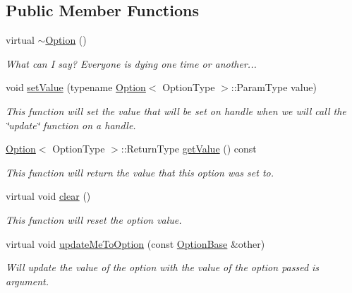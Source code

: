 \subsection*{Public Member Functions}
\begin{DoxyCompactItemize}
\item 
\hypertarget{classcurlpp_1_1Option_a116d6c5ee8953d0c947f589a44574c53}{virtual \hyperlink{classcurlpp_1_1Option_a116d6c5ee8953d0c947f589a44574c53}{$\sim$\-Option} ()}\label{classcurlpp_1_1Option_a116d6c5ee8953d0c947f589a44574c53}

\begin{DoxyCompactList}\small\item\em What can I say? Everyone is dying one time or another... \end{DoxyCompactList}\item 
\hypertarget{classcurlpp_1_1Option_ad2dcaf8f019108f8a6b0622a27b10bc1}{void \hyperlink{classcurlpp_1_1Option_ad2dcaf8f019108f8a6b0622a27b10bc1}{set\-Value} (typename \hyperlink{classcurlpp_1_1Option}{Option}$<$ Option\-Type $>$\-::Param\-Type value)}\label{classcurlpp_1_1Option_ad2dcaf8f019108f8a6b0622a27b10bc1}

\begin{DoxyCompactList}\small\item\em This function will set the value that will be set on handle when we will call the \char`\"{}update\char`\"{} function on a handle. \end{DoxyCompactList}\item 
\hyperlink{classcurlpp_1_1Option}{Option}$<$ Option\-Type $>$\-::Return\-Type \hyperlink{classcurlpp_1_1Option_aeceb0e587afdcfe6d826e2a745bb47fe}{get\-Value} () const 
\begin{DoxyCompactList}\small\item\em This function will return the value that this option was set to. \end{DoxyCompactList}\item 
virtual void \hyperlink{classcurlpp_1_1Option_a149e8845e36201f9e1f772947ffbfde0}{clear} ()
\begin{DoxyCompactList}\small\item\em This function will reset the option value. \end{DoxyCompactList}\item 
\hypertarget{classcurlpp_1_1Option_a838ca4e7bf68f5ded3e33455fc546151}{virtual void \hyperlink{classcurlpp_1_1Option_a838ca4e7bf68f5ded3e33455fc546151}{update\-Me\-To\-Option} (const \hyperlink{classcurlpp_1_1OptionBase}{Option\-Base} \&other)}\label{classcurlpp_1_1Option_a838ca4e7bf68f5ded3e33455fc546151}

\begin{DoxyCompactList}\small\item\em Will update the value of the option with the value of the option passed is argument. \end{DoxyCompactList}\end{DoxyCompactItemize}
